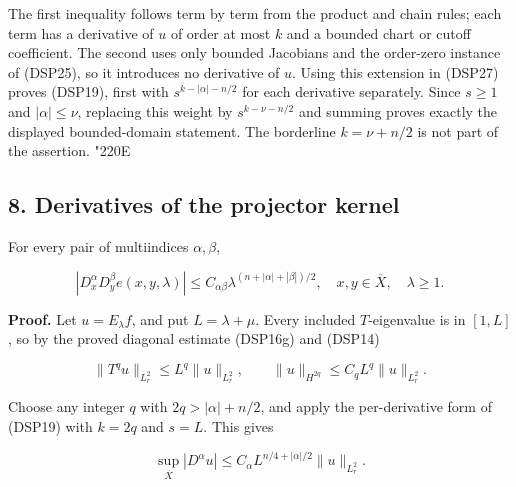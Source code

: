 \documentclass[
  11pt,
]{article}
\makeatletter
\let\ReaderOriginalAnchorStart\hyper@anchorstart
\let\ReaderOriginalAnchorEnd\hyper@anchorend
\let\ReaderPendingAliases\@empty
\def\ReaderArmAliases#1{\gdef\ReaderPendingAliases{#1}}
\def\hyper@anchorstart#1{\ReaderIfNativeAnchorTF{#1}{\ReaderPendingAliases\global\let\ReaderPendingAliases\@empty}{}\ReaderOriginalAnchorStart{#1}}
\makeatother
\begin{document}
The first inequality follows term by term from the product and chain
rules; each term has a derivative of \(u\) of order at most \(k\) and a
bounded chart or cutoff coefficient. The second uses only bounded
Jacobians and the order-zero instance of (DSP25), so it introduces no
derivative of \(u\). Using this extension in (DSP27) proves (DSP19),
first with \(s^{k-|\alpha|-n/2}\) for each derivative separately. Since
\(s\geq1\) and \(|\alpha|\leq\nu\), replacing this weight by
\(s^{k-\nu-n/2}\) and summing proves exactly the displayed
bounded-domain statement. The borderline \(k=\nu+n/2\) is not part of
the assertion. {\ReaderSymbols\char"220E}

\ReaderArmAliases{\ReaderOriginalAnchorStart{AN03-DSP-008}\ReaderOriginalAnchorEnd\begingroup\expandafter\def\csname @currentHref\endcsname{AN03-DSP-008}\label{AN03-DSP-008}\endgroup\ReaderOriginalAnchorStart{an03-dsp-008-derivatives-of-the-projector-kernel}\ReaderOriginalAnchorEnd\begingroup\expandafter\def\csname @currentHref\endcsname{an03-dsp-008-derivatives-of-the-projector-kernel}\label{an03-dsp-008-derivatives-of-the-projector-kernel}\endgroup\ReaderOriginalAnchorStart{8-derivatives-of-the-projector-kernel}\ReaderOriginalAnchorEnd\begingroup\expandafter\def\csname @currentHref\endcsname{8-derivatives-of-the-projector-kernel}\label{8-derivatives-of-the-projector-kernel}\endgroup\ReaderOriginalAnchorStart{derivatives-of-the-projector-kernel}\ReaderOriginalAnchorEnd}
\subsection{8. Derivatives of the projector
kernel}\label{derivatives-of-the-projector-kernel}

For every pair of multiindices \(\alpha,\beta\),

\[
 |D_x^\alpha D_y^\beta e(x,y,\lambda)|
 \leq C_{\alpha\beta}\lambda^{(n+|\alpha|+|\beta|)/2},
 \quad x,y\in\overline X,\quad\lambda\geq1.
 \tag{DSP28}
\]

\textbf{Proof.} Let \(u=E_\lambda f\), and put \(L=\lambda+\mu\). Every
included \(T\)-eigenvalue is in \([1,L]\), so by the proved diagonal
estimate (DSP16g) and (DSP14)

\[
 \|T^qu\|_{L^2_r}\leq L^q\|u\|_{L^2_r},\qquad
 \|u\|_{H^{2q}}\leq C_qL^q\|u\|_{L^2_r}.
 \tag{DSP29}
\]

Choose any integer \(q\) with \(2q>|\alpha|+n/2\), and apply the
per-derivative form of (DSP19) with \(k=2q\) and \(s=L\). This gives

\[
 \sup_{\overline X}|D^\alpha u|
 \leq C_\alpha L^{n/4+|\alpha|/2}\|u\|_{L^2_r}.
 \tag{DSP30}
\]
\end{document}
